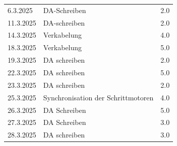 \begin{longtable}{|l|p{10cm}|r|}
    6.3.2025	&	DA-Schreiben	&	2.0\\
    11.3.2025	&	DA-schreiben	&	2.0\\
    14.3.2025	&	Verkabelung     &	4.0\\
    18.3.2025	&	Verkabelung	&	5.0\\
    19.3.2025   &   DA schreiben    &   2.0 \\
    22.3.2025   &   DA schreiben    &   5.0 \\
    23.3.2025   &   DA schreiben    &   2.0 \\
    25.3.2025	&	Synchronisation der Schrittmotoren	&	4.0\\
    26.3.2025   &   DA Schreiben    &   5.0 \\
    27.3.2025   &   DA Schreiben    &   3.0 \\
    28.3.2025	&	DA schreiben	&	3.0\\
\end{longtable}
\newpage

